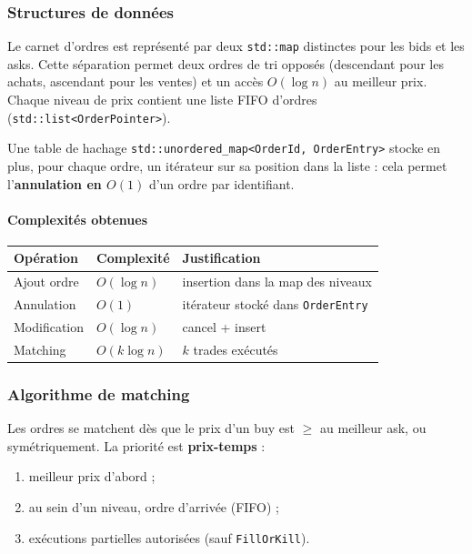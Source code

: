 \documentclass[11pt,a4paper]{article}
\begin{document}
\subsubsection{Structures de données}

Le carnet d'ordres est représenté par deux \texttt{std::map}
distinctes pour les bids et les asks. Cette séparation permet
deux ordres de tri opposés (descendant pour les achats,
ascendant pour les ventes) et un accès $O(\log n)$ au meilleur
prix. Chaque niveau de prix contient une liste FIFO d'ordres
(\texttt{std::list<OrderPointer>}).

Une table de hachage \texttt{std::unordered\_map<OrderId,
OrderEntry>} stocke en plus, pour chaque ordre, un itérateur
sur sa position dans la liste : cela permet l'\textbf{annulation
en $O(1)$} d'un ordre par identifiant.

\paragraph{Complexités obtenues}
\begin{center}
    \begin{tabular}{lll}
        \toprule
        Opération & Complexité & Justification \\
        \midrule
        Ajout ordre & $O(\log n)$ & insertion dans la map des niveaux \\
        Annulation  & $O(1)$      & itérateur stocké dans \texttt{OrderEntry} \\
        Modification & $O(\log n)$ & cancel + insert \\
        Matching    & $O(k \log n)$ & $k$ trades exécutés \\
        \bottomrule
    \end{tabular}
\end{center}

\subsubsection{Algorithme de matching}

Les ordres se matchent dès que le prix d'un buy est
$\geq$ au meilleur ask, ou symétriquement. La priorité est
\textbf{prix-temps} :
\begin{enumerate}[leftmargin=1.2cm]
    \item meilleur prix d'abord ;
    \item au sein d'un niveau, ordre d'arrivée (FIFO) ;
    \item exécutions partielles autorisées (sauf
          \texttt{FillOrKill}).
\end{enumerate}
\end{document}
